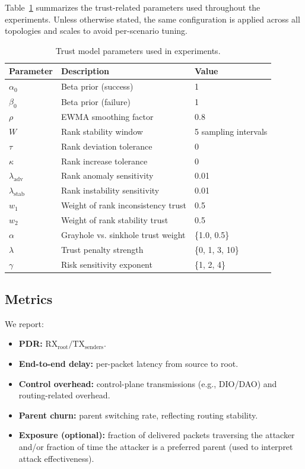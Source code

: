 \documentclass[11pt,a4paper]{article}
\begin{document}
Table~\ref{tab:trust-params} summarizes the trust-related parameters used throughout the experiments. Unless otherwise stated, the same configuration is applied across all topologies and scales to avoid per-scenario tuning.

\begin{table}[t]
\centering
\caption{Trust model parameters used in experiments.}
\label{tab:trust-params}
\begin{tabular}{lll}
\toprule
Parameter & Description & Value \\
\midrule
$\alpha_0$ & Beta prior (success) & 1 \\
$\beta_0$  & Beta prior (failure) & 1 \\
$\rho$     & EWMA smoothing factor & 0.8 \\
$W$        & Rank stability window & 5 sampling intervals \\
$\tau$     & Rank deviation tolerance & 0 \\
$\kappa$   & Rank increase tolerance & 0 \\
$\lambda_{\text{adv}}$ & Rank anomaly sensitivity & 0.01 \\
$\lambda_{\text{stab}}$ & Rank instability sensitivity & 0.01 \\
$w_1$      & Weight of rank inconsistency trust & 0.5 \\
$w_2$      & Weight of rank stability trust & 0.5 \\
$\alpha$   & Grayhole vs. sinkhole trust weight & \{1.0, 0.5\} \\
$\lambda$  & Trust penalty strength & \{0, 1, 3, 10\} \\
$\gamma$   & Risk sensitivity exponent & \{1, 2, 4\} \\
\bottomrule
\end{tabular}
\end{table}

\subsection{Metrics}
We report:
\begin{itemize}[leftmargin=*]
  \item \textbf{PDR:} $\mathrm{RX}_{\text{root}} / \mathrm{TX}_{\text{senders}}$.
  \item \textbf{End-to-end delay:} per-packet latency from source to root.
  \item \textbf{Control overhead:} control-plane transmissions (e.g., DIO/DAO) and routing-related overhead.
  \item \textbf{Parent churn:} parent switching rate, reflecting routing stability.
  \item \textbf{Exposure (optional):} fraction of delivered packets traversing the attacker and/or fraction of time the attacker is a preferred parent (used to interpret attack effectiveness).
\end{itemize}
\end{document}
